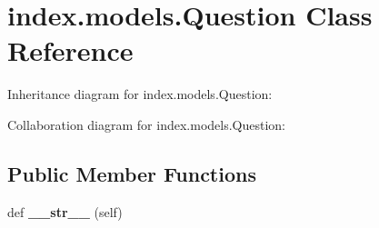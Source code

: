 \hypertarget{classindex_1_1models_1_1Question}{}\section{index.\+models.\+Question Class Reference}
\label{classindex_1_1models_1_1Question}


Inheritance diagram for index.\+models.\+Question\+:


Collaboration diagram for index.\+models.\+Question\+:
\subsection*{Public Member Functions}
\begin{DoxyCompactItemize}
\item 
\mbox{\label{classindex_1_1models_1_1Question_af0e8e1af664a2acc48c74b976985f70c}} 
def {\bfseries \+\_\+\+\_\+str\+\_\+\+\_\+} (self)
\end{DoxyCompactItemize}
